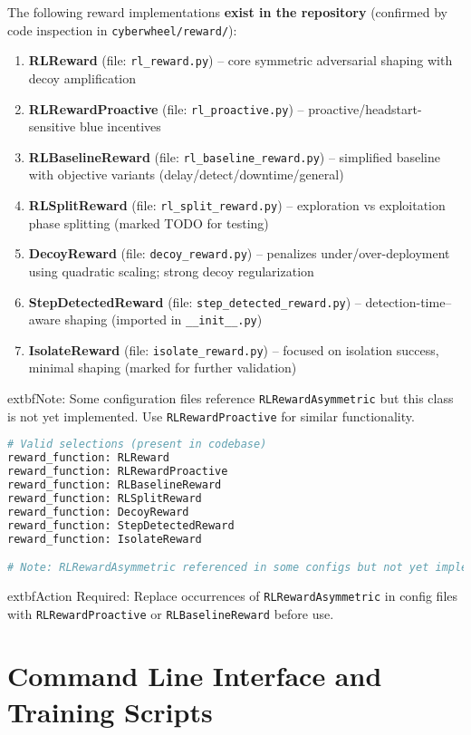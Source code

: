 \documentclass[12pt,a4paper]{article}
\begin{document}
The following reward implementations \textbf{exist in the repository} (confirmed by code inspection in \texttt{cyberwheel/reward/}):
\begin{enumerate}
    \item \textbf{RLReward} (file: \texttt{rl\_reward.py}) – core symmetric adversarial shaping with decoy amplification
    \item \textbf{RLRewardProactive} (file: \texttt{rl\_proactive.py}) – proactive/headstart-sensitive blue incentives
    \item \textbf{RLBaselineReward} (file: \texttt{rl\_baseline\_reward.py}) – simplified baseline with objective variants (delay/detect/downtime/general)
    \item \textbf{RLSplitReward} (file: \texttt{rl\_split\_reward.py}) – exploration vs exploitation phase splitting (marked TODO for testing)
    \item \textbf{DecoyReward} (file: \texttt{decoy\_reward.py}) – penalizes under/over-deployment using quadratic scaling; strong decoy regularization
    \item \textbf{StepDetectedReward} (file: \texttt{step\_detected\_reward.py}) – detection-time–aware shaping (imported in \texttt{__init__.py})
    \item \textbf{IsolateReward} (file: \texttt{isolate\_reward.py}) – focused on isolation success, minimal shaping (marked for further validation)
\end{enumerate}

	extbf{Note}: Some configuration files reference \texttt{RLRewardAsymmetric} but this class is not yet implemented. Use \texttt{RLRewardProactive} for similar functionality.

\begin{lstlisting}[language=Python, caption=Reward Function Selection Examples (Adjusted)]
# Valid selections (present in codebase)
reward_function: RLReward
reward_function: RLRewardProactive
reward_function: RLBaselineReward
reward_function: RLSplitReward
reward_function: DecoyReward
reward_function: StepDetectedReward
reward_function: IsolateReward

# Note: RLRewardAsymmetric referenced in some configs but not yet implemented
\end{lstlisting}

	extbf{Action Required}: Replace occurrences of \texttt{RLRewardAsymmetric} in config files with \texttt{RLRewardProactive} or \texttt{RLBaselineReward} before use.

\section{Command Line Interface and Training Scripts}
\end{document}
